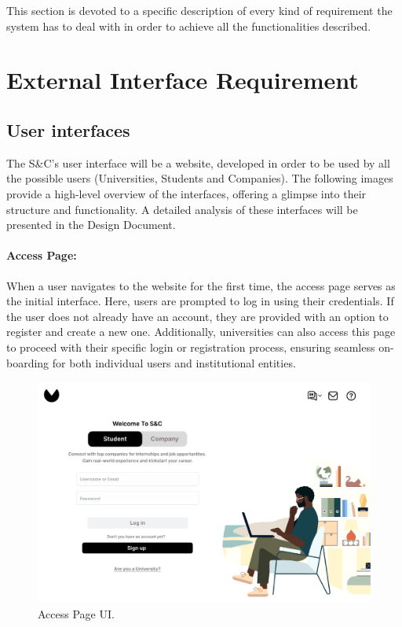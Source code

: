 This section is devoted to a specific description of every kind of requirement the system has to deal with in order to achieve all the functionalities described.


\section{ External Interface Requirement}
\label{sec:external_interface_requirements}%


\subsection{User interfaces}
\label{subsec:User_interfaces}%


The S\&C's user interface will be a website, developed in order to be used by all the possible users (Universities, Students and Companies).
The following images provide a high-level overview of the interfaces, offering a glimpse into their structure and functionality. A detailed analysis of these interfaces will be presented in the Design Document.

\newpage

\paragraph{Access Page:} When a user navigates to the website for the first time, the access page serves as the initial interface. Here, users are prompted to log in using their credentials. If the user does not already have an account, they are provided with an option to register and create a new one. Additionally, universities can also access this page to proceed with their specific login or registration process, ensuring seamless on-boarding for both individual users and institutional entities.

\begin{figure}[H]
    \begin{center}
        \includegraphics[width=\linewidth]{Images/UserInterfaces/AccessPage.pdf}
        \caption{Access Page UI.}
        \label{fig:access_page_UI}%
    \end{center}
\end{figure}

